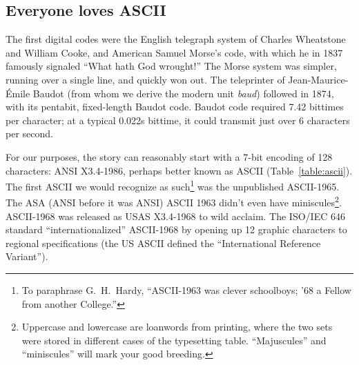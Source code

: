 \documentclass[letterpaper,10pt]{article}
\begin{document}
\subsection{Everyone loves ASCII}
\begin{figure}
\end{figure}
The first digital codes were the English telegraph system of Charles Wheatstone
and William Cooke, and American Samuel Morse's code, with which he in 1837 famously
signaled ``What hath God wrought!'' The Morse system was simpler, running
over a single line, and quickly won out. The teleprinter of Jean-Maurice-Émile Baudot
(from whom we derive the modern unit \textit{baud}) followed in
1874\cite{evolutioncodes}, with its pentabit, fixed-length Baudot code. Baudot
code required 7.42 bittimes per character; at a typical 0.022s bittime, it
could transmit just over 6 characters per second\cite{martin}.

For our purposes, the story can reasonably start with a 7-bit encoding of
128 characters: ANSI X3.4-1986, perhaps better known as ASCII (Table~\ref{table:ascii}).
The first ASCII we would recognize as such\footnote{To paraphrase G.\ H.\
Hardy, ``ASCII-1963 was clever schoolboys; '68 a Fellow from another
College\cite{ghhardy}.''} was the unpublished ASCII-1965. The ASA (ANSI
before it was ANSI) ASCII 1963 didn't even have miniscules\footnote{Uppercase
and lowercase are loanwords from printing, where the two sets were
stored in different cases of the typesetting table. ``Majuscules'' and
``miniscules'' will mark your good breeding.}. ASCII-1968 was
released as USAS X3.4-1968 to wild acclaim. The ISO/IEC 646 standard\cite{iso646}
``internationalized'' ASCII-1968 by opening up 12 graphic characters to
regional specifications (the US ASCII defined the ``International Reference
Variant'')\cite{aivosto}.
\end{document}
